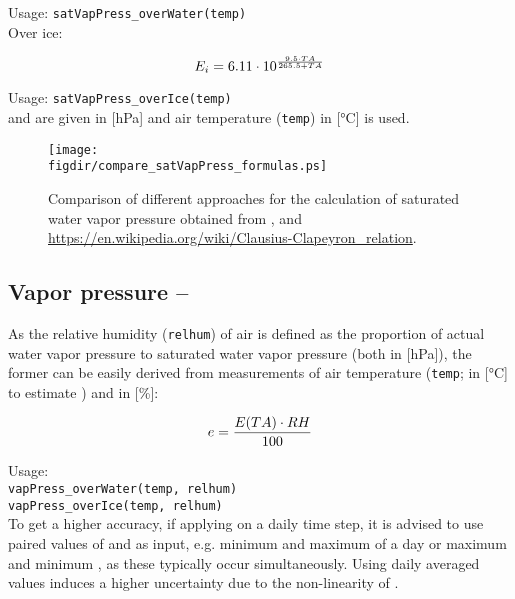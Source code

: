 \noindent
Usage:
\verb!satVapPress_overWater(temp)!\\

\noindent
Over ice:

\begin{equation} \label{eqn:meteo:satVapPressIce}
E_i{} = 6.11 \cdot 10^{\frac{9.5 \cdot TA{}}{265.5 + TA{}}}
\end{equation}

\noindent
Usage:
\verb!satVapPress_overIce(temp)!\\

\satVaporPressureWater{} and \satVaporPressureIce{} are given in [\si{\hecto\pascal}] and air temperature \airtemp{} (\verb!temp!) in [\si{\degreeCelsius}] is used.

\begin{figure}
  \centering
  \texttt{[image: \\figdir/compare\_satVapPress\_formulas.ps]}
  \caption{Comparison of different approaches for the calculation of saturated water vapor pressure obtained from \citet{Dyck1995, Neitsch2011}, and \url{https://en.wikipedia.org/wiki/Clausius-Clapeyron_relation}. \label{fig:meteo:satVapPress}}
\end{figure}


\subsection{Vapor pressure -- \vaporPressure} \label{sec:meteo:vappress}
As the relative humidity \relHumidity{} (\verb!relhum!) of air is defined as the proportion of actual water vapor pressure \vaporPressure{} to saturated water vapor pressure \satVaporPressure{} (both in [\si{\hecto\pascal}]), the former can be easily derived from measurements of air temperature \airtemp{} (\verb!temp!; in [\si{\degreeCelsius}] to estimate \satVaporPressure{}) and \relHumidity{} in [\si{\percent}]:

\begin{equation} \label{eqn:meteo:vapPress}
e{} = \frac{E{(TA{})} \cdot RH{}}{100}
\end{equation}

\noindent
Usage:\\
\verb!vapPress_overWater(temp, relhum)!\\
\verb!vapPress_overIce(temp, relhum)!\\

To get a higher accuracy, if applying  on a daily time step, it is advised to use paired values of \airtemp{} and \relHumidity{} as input, e.g. minimum \relHumidity{} and maximum \airtemp{} of a day or maximum \relHumidity{} and minimum \airtemp{}, as these typically occur simultaneously. Using daily averaged values induces a higher uncertainty due to the non-linearity of \satVaporPressure{(\airtemp{})}.


